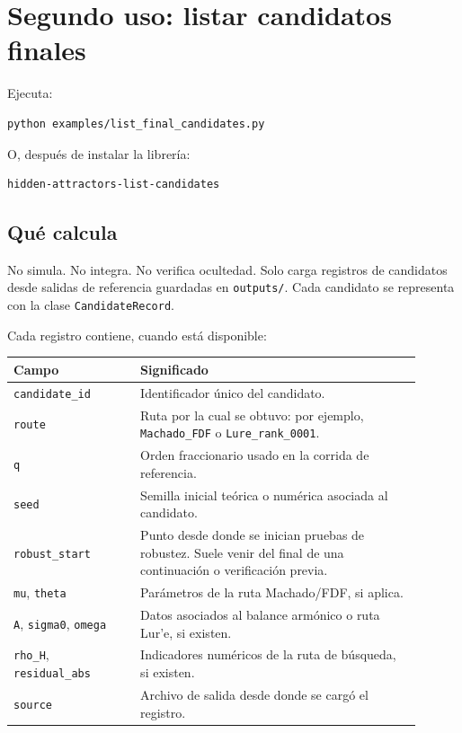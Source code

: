 \documentclass[11pt,letterpaper]{article}
\begin{document}
\section{Segundo uso: listar candidatos finales}

Ejecuta:

\begin{lstlisting}[style=terminal]
python examples/list_final_candidates.py
\end{lstlisting}

O, después de instalar la librería:

\begin{lstlisting}[style=terminal]
hidden-attractors-list-candidates
\end{lstlisting}

\subsection{Qué calcula}

No simula. No integra. No verifica ocultedad. Solo carga registros de candidatos desde salidas de referencia guardadas en \texttt{outputs/}. Cada candidato se representa con la clase \texttt{CandidateRecord}.

Cada registro contiene, cuando está disponible:

\begin{center}
\begin{tabular}{p{0.28\linewidth}p{0.62\linewidth}}
\toprule
Campo & Significado \\
\midrule
\texttt{candidate\_id} & Identificador único del candidato. \\
\texttt{route} & Ruta por la cual se obtuvo: por ejemplo, \texttt{Machado\_FDF} o \texttt{Lure\_rank\_0001}. \\
\texttt{q} & Orden fraccionario usado en la corrida de referencia. \\
\texttt{seed} & Semilla inicial teórica o numérica asociada al candidato. \\
\texttt{robust\_start} & Punto desde donde se inician pruebas de robustez. Suele venir del final de una continuación o verificación previa. \\
\texttt{mu}, \texttt{theta} & Parámetros de la ruta Machado/FDF, si aplica. \\
\texttt{A}, \texttt{sigma0}, \texttt{omega} & Datos asociados al balance armónico o ruta Lur'e, si existen. \\
\texttt{rho\_H}, \texttt{residual\_abs} & Indicadores numéricos de la ruta de búsqueda, si existen. \\
\texttt{source} & Archivo de salida desde donde se cargó el registro. \\
\bottomrule
\end{tabular}
\end{center}
\end{document}
